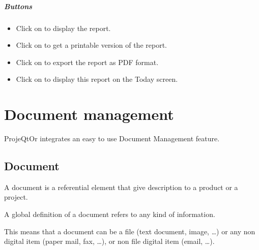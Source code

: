 \documentclass[letterpaper,10pt,english]{sphinxmanual}
\begin{document}
\paragraph{Buttons}
\begin{itemize}
\item {} 
Click on  to display the report.

\item {} 
Click on  to get a printable version of the report.

\item {} 
Click on  to export the report as PDF format.

\item {} 
Click on  to display this report on the Today screen.

\end{itemize}


\chapter{Document management}
\label{index:document-management}
ProjeQtOr integrates an easy to use Document Management feature.
\newpage
{}

\section{Document}
\label{Document:index-0}\label{Document:document}\label{Document::doc}
A document is a referential element that give description to a product or a project.

A global definition of a document refers to any kind of information.

This means that a document can be a file (text document, image, …) or any non digital item (paper mail, fax, …), or non file digital item (email, …).
\end{document}
